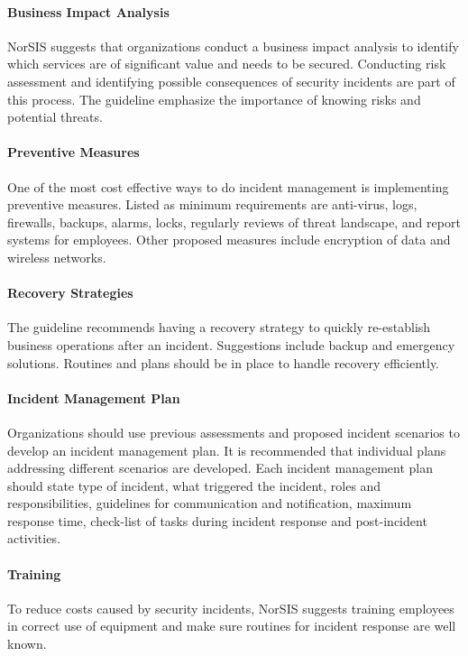 \paragraph{Business Impact Analysis}
NorSIS suggests that organizations conduct a business impact analysis to identify which services are of significant value and needs to be secured. Conducting risk assessment and identifying possible consequences of security incidents are part of this process. The guideline emphasize the importance of knowing risks and potential threats.  

\paragraph{Preventive Measures}
One of the most cost effective ways to do incident management is implementing preventive measures. Listed as minimum requirements are anti-virus, logs, firewalls, backups, alarms, locks, regularly reviews of threat landscape, and report systems for employees. Other proposed measures include encryption of data and wireless networks.   

\paragraph{Recovery Strategies}
The guideline recommends having a recovery strategy to quickly re-establish business operations after an incident. Suggestions include backup and emergency solutions. Routines and plans should be in place to handle recovery efficiently.

\paragraph{Incident Management Plan}
Organizations should use previous assessments and proposed incident scenarios to develop an incident management plan. It is recommended that individual plans addressing different scenarios are developed. Each incident management plan should state type of incident, what triggered the incident, roles and responsibilities, guidelines for communication and notification, maximum response time, check-list of tasks during incident response and post-incident activities.

\paragraph{Training}
To reduce costs caused by security incidents, NorSIS suggests training employees in correct use of equipment and make sure routines for incident response are well known.

